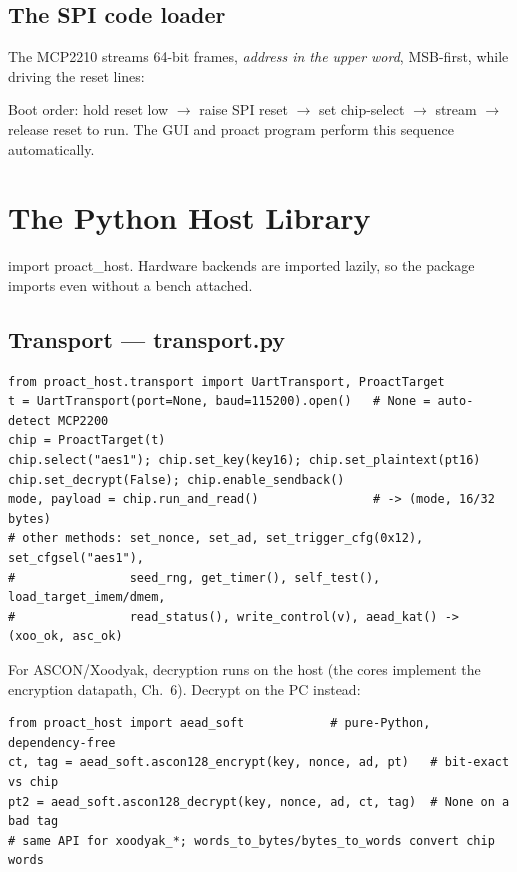 \documentclass[11pt,a4paper]{report}
\newcommand{\code}[1]{{\ttfamily\small #1}}
\begin{document}
\section{The SPI code loader}
The MCP2210 streams 64-bit frames, \emph{address in the upper word}, MSB-first,
while driving the reset lines:
\begin{center}
\end{center}
Boot order: hold reset low $\rightarrow$ raise SPI reset $\rightarrow$ set
chip-select $\rightarrow$ stream $\rightarrow$ release reset to run. The GUI and
\code{proact program} perform this sequence automatically.

\chapter{The Python Host Library}
\code{import proact\_host}. Hardware backends are imported lazily, so the package
imports even without a bench attached.

\section{Transport --- \code{transport.py}}
\begin{lstlisting}[style=py]
from proact_host.transport import UartTransport, ProactTarget
t = UartTransport(port=None, baud=115200).open()   # None = auto-detect MCP2200
chip = ProactTarget(t)
chip.select("aes1"); chip.set_key(key16); chip.set_plaintext(pt16)
chip.set_decrypt(False); chip.enable_sendback()
mode, payload = chip.run_and_read()                # -> (mode, 16/32 bytes)
# other methods: set_nonce, set_ad, set_trigger_cfg(0x12), set_cfgsel("aes1"),
#                seed_rng, get_timer(), self_test(), load_target_imem/dmem,
#                read_status(), write_control(v), aead_kat() -> (xoo_ok, asc_ok)
\end{lstlisting}
For ASCON/Xoodyak, decryption runs on the host (the cores implement the
encryption datapath, Ch.~6). Decrypt on the PC instead:
\begin{lstlisting}[style=py]
from proact_host import aead_soft            # pure-Python, dependency-free
ct, tag = aead_soft.ascon128_encrypt(key, nonce, ad, pt)   # bit-exact vs chip
pt2 = aead_soft.ascon128_decrypt(key, nonce, ad, ct, tag)  # None on a bad tag
# same API for xoodyak_*; words_to_bytes/bytes_to_words convert chip words
\end{lstlisting}
\end{document}
